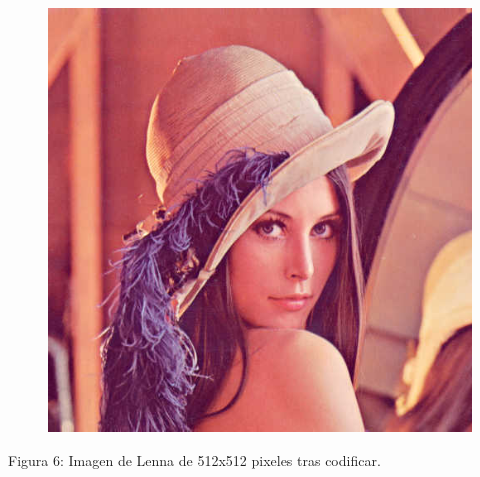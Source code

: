 \documentclass[%
final,
%
reprint,
%
notitlepage,
narroweqnarray,
inline,
twoside,
invited
]{ieee}
\begin{document}
\begin{figure}[H]
	\begin{center}
	\includegraphics[scale=0.7]{./img/lenaout.png}
	\end{center}
\end{figure}
\begin{center}
\par Figura 6: Imagen de Lenna de 512x512 pixeles tras codificar.
\end{center}
\end{document}
